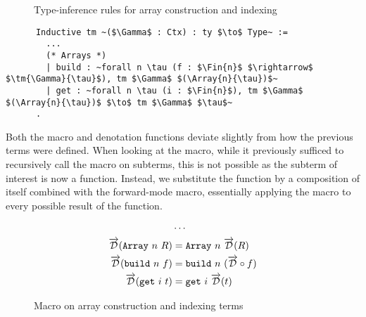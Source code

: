
  \begin{figure}
    \caption{Type-inference rules for array construction and indexing}
    \label{fig:array_infer}
  \end{figure}

  \begin{listing}
    \begin{verbatim}
      Inductive tm ~($\Gamma$ : Ctx) : ty $\to$ Type~ :=
        ...
        (* Arrays *)
        | build : ~forall n \tau (f : $\Fin{n}$ $\rightarrow$ $\tm{\Gamma}{\tau}$), tm $\Gamma$ $(\Array{n}{\tau})$~
        | get : ~forall n \tau (i : $\Fin{n}$), tm $\Gamma$ $(\Array{n}{\tau})$ $\to$ tm $\Gamma$ $\tau$~
      .
    \end{verbatim}
    \caption{The terms related to array types included in our language}
    \label{lst:tm_array}
  \end{listing}

  Both the macro and denotation functions deviate slightly from how the previous terms were defined.
  When looking at the macro, while it previously sufficed to recursively call the macro on subterms, this is not possible as the subterm of interest is now a function.
  Instead, we substitute the function by a composition of itself combined with the forward-mode macro, essentially applying the macro to every possible result of the function.

  \begin{figure}
    \centering
    \begin{align*}
        &\cdots \\
        \overrightarrow{\mathcal{D}}(\texttt{Array}\ n\ R) &= \texttt{Array}\ n\ \overrightarrow{\mathcal{D}}(R) \\
        \overrightarrow{\mathcal{D}}(\texttt{build}\ n\ f) &= \texttt{build}\ n\ (\overrightarrow{\mathcal{D}} \circ f) \\
        \overrightarrow{\mathcal{D}}(\texttt{get}\ i\ t) &= \texttt{get}\ i\ \overrightarrow{\mathcal{D}}(t)
    \end{align*}
    \caption{Macro on array construction and indexing terms}
    \label{eqn:macro_array}
  \end{figure}

